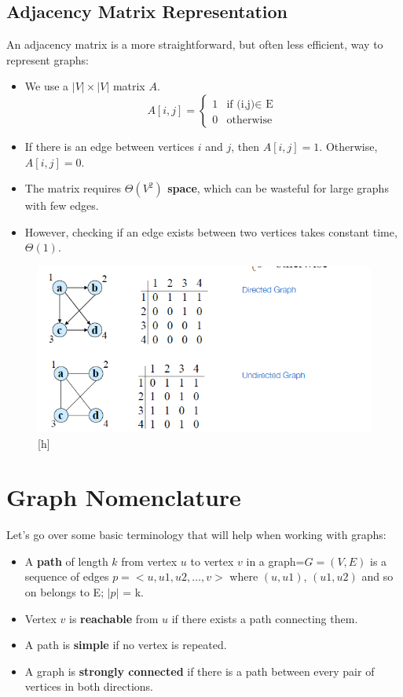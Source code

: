 \subsection{Adjacency Matrix Representation}
An adjacency matrix is a more straightforward, but often less efficient, way to represent graphs:
\begin{itemize}
    \item We use a $|V| \times |V|$ matrix $A$.
        \[
        A[i, j] = 
        \begin{cases}
            1 & \text{if (i,j)$\in$ E} \\
            0 & \text{otherwise } 
        \end{cases}
        \]
    \item If there is an edge between vertices $i$ and $j$, then $A[i, j] = 1$. Otherwise, $A[i, j] = 0$.
    \item The matrix requires \textbf{ $\Theta(V^2)$ space}, which can be wasteful for large graphs with few edges.
    \item However, checking if an edge exists between two vertices takes constant time, $\Theta(1)$.
\end{itemize}
\begin{figure}[h!]
    \centering
    \includegraphics[width=0.75\linewidth]{Adjacency matrix.png}[h]

\end{figure}

\section{Graph Nomenclature}
Let's go over some basic terminology that will help when working with graphs:
\begin{itemize}
    \item A \textbf{path} of length $k$ from vertex $u$ to vertex $v$ in a graph=$G=(V,E)$ is a sequence of edges $p=<u,u1,u2, … , v> $ where $(u,u1)$, $(u1,u2)$ and
so on belongs to E; $|p|$ = k.
    \item Vertex $v$ is \textbf{reachable} from $u$ if there exists a path connecting them.
    \item A path is \textbf{simple} if no vertex is repeated.
    \item A graph is \textbf{strongly connected} if there is a path between every pair of vertices in both directions.
\end{itemize}
